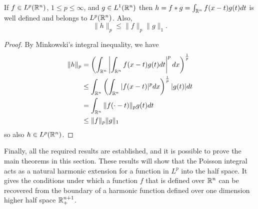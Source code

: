 \begin{lemma}\label{lemma:conv-lp}
    If $f\in L^p(\mathbb R^n)$, $1\leq p\leq\infty$, and $g\in L^1(\mathbb R^n)$ then $h=f*g=\int_{\mathbb R^n}f(x-t)g(t)dt$ is well defined and belongs to $L^p(\mathbb R^n)$. Also,
    \begin{equation*}
        \|h\|_p\leq\|f\|_p\|g\|_1.
    \end{equation*}
\end{lemma}
\begin{proof}
    By Minkowski's integral inequality, we have
    \begin{align*}
        \|h\|_p&=\left(\int_{\mathbb R^n}\left|\int_{\mathbb R^n}f(x-t)g(t)dt\right|^pdx\right)^{\frac{1}{p}} \\
        &\leq\int_{\mathbb R^n}\left(\int_{\mathbb R^n}|f(x-t)|^pdx\right)^{\frac{1}{p}}|g(t)|dt \\
        &=\int_{\mathbb R^n}\|f(\cdot-t)\|_pg(t)dt \\
        &\leq\|f\|_p\|g\|_1
    \end{align*}
    so also $h\in L^p(\mathbb R^n)$.
\end{proof}

Finally, all the required results are established, and it is possible to prove the main theorems in this section. These results will show that the Poisson integral acts as a natural harmonic extension for a function in $L^p$ into the half space. It gives the conditions under which a function $f$ that is defined over $\mathbb R^n$ can be recovered from the boundary of a harmonic function defined over one dimension higher half space $\mathbb R^{n+1}_+$.

